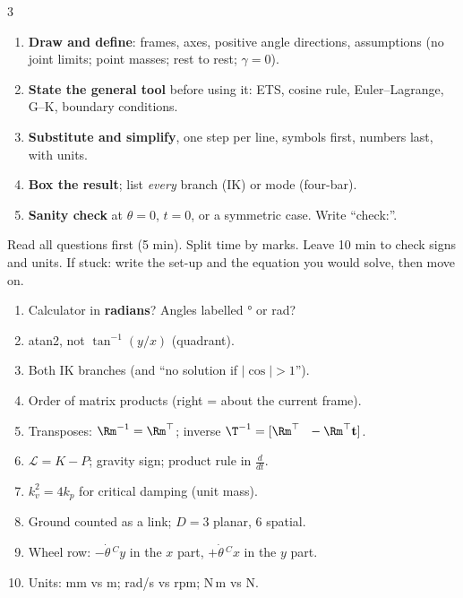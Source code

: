 \begin{multicols}{3}
\columnbreak
{}
\begin{enumerate}
\item \textbf{Draw and define}: frames, axes, positive angle directions, assumptions (no joint limits; point masses; rest to rest; $\gamma=0$).
\item \textbf{State the general tool} before using it: ETS, cosine rule, Euler–Lagrange, G–K, boundary conditions.
\item \textbf{Substitute and simplify}, one step per line, symbols first, numbers last, with units.
\item \textbf{Box the result}; list \emph{every} branch (IK) or mode (four-bar).
\item \textbf{Sanity check} at $\theta=0$, $t=0$, or a symmetric case. Write ``check:''.
\end{enumerate}
Read all questions first (5 min). Split time by marks. Leave 10 min to check signs and units. If stuck: write the set-up and the equation you would solve, then move on.

\begin{enumerate}
\item Calculator in \textbf{radians}? Angles labelled ° or rad?
\item atan2, not $\tan^{-1}(y/x)$ (quadrant).
\item Both IK branches (and ``no solution if $|\cos|>1$'').
\item Order of matrix products (right = about the current frame).
\item Transposes: $\Rm^{-1}=\Rm^\top$; inverse $\T^{-1}=[\Rm^\top\ \ -\Rm^\top\mathbf t]$.
\item $\mathcal L=K-P$; gravity sign; product rule in $\frac{d}{dt}$.
\item $k_v^2=4k_p$ for critical damping (unit mass).
\item Ground counted as a link; $D=3$ planar, 6 spatial.
\item Wheel row: $-\dot\theta\,{}^Cy$ in the $x$ part, $+\dot\theta\,{}^Cx$ in the $y$ part.
\item Units: mm vs m; rad/s vs rpm; N\,m vs N.
\end{enumerate}


\end{multicols}

